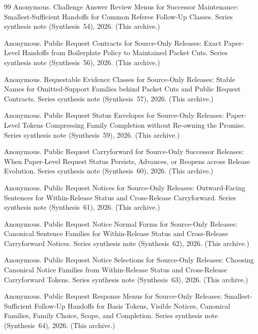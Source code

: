 \documentclass[11pt]{article}
\begin{document}
\begin{thebibliography}{99}
Anonymous.
\newblock Challenge Answer Review Menus for Successor Maintenance: Smallest-Sufficient Handoffs for Common Referee Follow-Up Classes.
\newblock Series synthesis note (Synthesis~54), 2026. (This archive.)

Anonymous.
\newblock Public Request Contracts for Source-Only Releases: Exact Paper-Level Handoffs from Boilerplate Policy to Maintained Packet Cuts.
\newblock Series synthesis note (Synthesis~56), 2026. (This archive.)

Anonymous.
\newblock Requestable Evidence Classes for Source-Only Releases: Stable Names for Omitted-Support Families behind Packet Cuts and Public Request Contracts.
\newblock Series synthesis note (Synthesis~57), 2026. (This archive.)


Anonymous.
\newblock Public Request Status Envelopes for Source-Only Releases: Paper-Level Tokens Compressing Family Completion without Re-owning the Promise.
\newblock Series synthesis note (Synthesis~59), 2026. (This archive.)

Anonymous.
\newblock Public Request Carryforward for Source-Only Successor Releases: When Paper-Level Request Status Persists, Advances, or Reopens across Release Evolution.
\newblock Series synthesis note (Synthesis~60), 2026. (This archive.)

Anonymous.
\newblock Public Request Notices for Source-Only Releases: Outward-Facing Sentences for Within-Release Status and Cross-Release Carryforward.
\newblock Series synthesis note (Synthesis~61), 2026. (This archive.)

Anonymous.
\newblock Public Request Notice Normal Forms for Source-Only Releases: Canonical Sentence Families for Within-Release Status and Cross-Release Carryforward Notices.
\newblock Series synthesis note (Synthesis~62), 2026. (This archive.)

Anonymous.
\newblock Public Request Notice Selections for Source-Only Releases: Choosing Canonical Notice Families from Within-Release Status and Cross-Release Carryforward Tokens.
\newblock Series synthesis note (Synthesis~63), 2026. (This archive.)

Anonymous.
\newblock Public Request Response Menus for Source-Only Releases: Smallest-Sufficient Follow-Up Handoffs for Basis Tokens, Visible Notices, Canonical Families, Family Choice, Scope, and Completion.
\newblock Series synthesis note (Synthesis~64), 2026. (This archive.)


\end{thebibliography}
\end{document}
